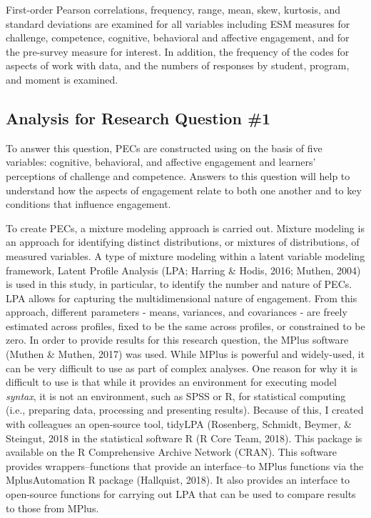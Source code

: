 \documentclass[]{book}
\theoremstyle{definition}
\theoremstyle{definition}
\theoremstyle{definition}
\theoremstyle{remark}
\begin{document}
First-order Pearson correlations, frequency, range, mean, skew,
kurtosis, and standard deviations are examined for all variables
including ESM measures for challenge, competence, cognitive, behavioral
and affective engagement, and for the pre-survey measure for interest.
In addition, the frequency of the codes for aspects of work with data,
and the numbers of responses by student, program, and moment is
examined.

\subsection{Analysis for Research Question
\#1}\label{analysis-for-research-question-1}

To answer this question, PECs are constructed using on the basis of five
variables: cognitive, behavioral, and affective engagement and learners'
perceptions of challenge and competence. Answers to this question will
help to understand how the aspects of engagement relate to both one
another and to key conditions that influence engagement.

To create PECs, a mixture modeling approach is carried out. Mixture
modeling is an approach for identifying distinct distributions, or
mixtures of distributions, of measured variables. A type of mixture
modeling within a latent variable modeling framework, Latent Profile
Analysis (LPA; Harring \& Hodis, 2016; Muthen, 2004) is used in this
study, in particular, to identify the number and nature of PECs. LPA
allows for capturing the multidimensional nature of engagement. From
this approach, different parameters - means, variances, and covariances
- are freely estimated across profiles, fixed to be the same across
profiles, or constrained to be zero. In order to provide results for
this research question, the MPlus software (Muthen \& Muthen, 2017) was
used. While MPlus is powerful and widely-used, it can be very difficult
to use as part of complex analyses. One reason for why it is difficult
to use is that while it provides an environment for executing model
\emph{syntax}, it is not an environment, such as SPSS or R, for
statistical computing (i.e., preparing data, processing and presenting
results). Because of this, I created with colleagues an open-source
tool, tidyLPA (Rosenberg, Schmidt, Beymer, \& Steingut, 2018 in the
statistical software R (R Core Team, 2018). This package is available on
the R Comprehensive Archive Network (CRAN). This software provides
wrappers--functions that provide an interface--to MPlus functions via
the MplusAutomation R package (Hallquist, 2018). It also provides an
interface to open-source functions for carrying out LPA that can be used
to compare results to those from MPlus.
\end{document}
